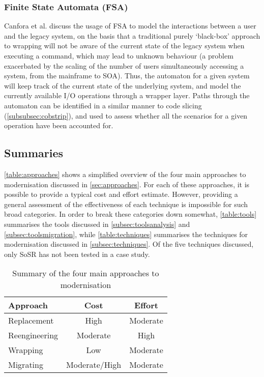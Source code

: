 \documentclass[12pt,journal,compsoc]{IEEEtran}
\begin{document}
\subsubsection{Finite State Automata (FSA)}
Canfora et al. \cite{Canfora2006,Canfora2008} discuss the usage of FSA to model the interactions between a user and the legacy system, on the basis that a traditional purely `black-box' approach to wrapping will not be aware of the current state of the legacy system when executing a command, which may lead to unknown behaviour (a problem exacerbated by the scaling of the number of users simultaneously accessing a system, from the mainframe to SOA). Thus, the automaton for a given system will keep track of the current state of the underlying system, and model the currently available I/O operations through a wrapper layer. Paths through the automaton can be identified in a similar manner to code slicing (\autoref{subsubsec:cobstrip}), and used to assess whether all the scenarios for a given operation have been accounted for.

\subsection{Summaries}
\label{subsec:summary}

\autoref{table:approaches} shows a simplified overview of the four main approaches to modernisation discussed in \autoref{sec:approaches}. For each of these approaches, it is possible to provide a typical cost and effort estimate. However, providing a general assessment of the effectiveness of each technique is impossible for such broad categories. In order to break these categories down somewhat, \autoref{table:tools} summarises the tools discussed in \autoref{subsec:toolsanalysis} and \autoref{subsec:toolsmigration}, while \autoref{table:techniques} summarises the techniques for modernisation discussed in \autoref{subsec:techniques}. Of the five techniques discussed, only SoSR has not been tested in a case study.

\begin{table}[h!]
\caption{Summary of the four main approaches to modernisation}
\label{table:approaches}
\centering
\begin{tabular}{| l | c | c |}
  \hline
  \textbf{Approach} & \textbf{Cost} & \textbf{Effort} \\ \hline
  Replacement & High & Moderate \\ \hline
  Reengineering & Moderate & High \\ \hline
  Wrapping & Low & Moderate \\ \hline
  Migrating & Moderate/High & Moderate \\ \hline
\end{tabular}
\end{table}
\end{document}
